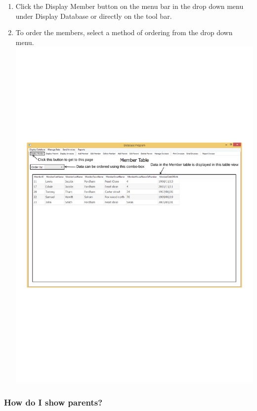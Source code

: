 \begin{enumerate}
	\item Click the Display Member button on the menu bar in the drop down menu under Display Database or directly on the tool bar.
	\item To order the members, select a method of ordering from the drop down menu.
\includegraphics[width=\textwidth]{./Manual/Images/ShowMember.pdf}
\end{enumerate}


\subsubsection{How do I show parents?}
\label{show_parent}

